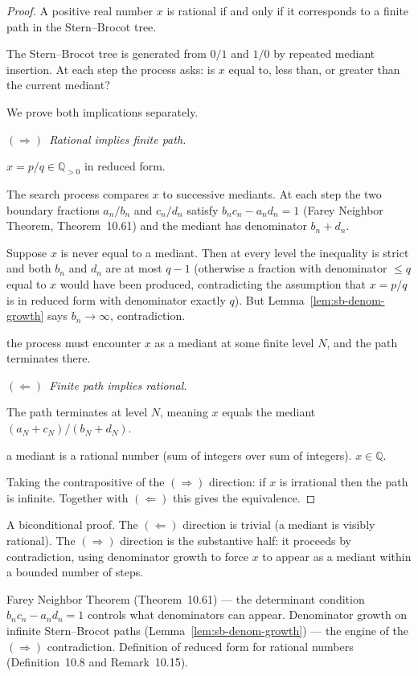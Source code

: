 \begin{proof}
\Claim A positive real number $x$ is rational if and only if it
corresponds to a finite path in the Stern--Brocot tree.

\Given The Stern--Brocot tree is generated from $0/1$ and $1/0$ by
repeated mediant insertion. At each step the process asks: is $x$ equal
to, less than, or greater than the current mediant?

\Strategy We prove both implications separately.

\medskip
\noindent$(\Rightarrow)$\ \textit{Rational implies finite path.}

\Given $x = p/q \in \mathbb{Q}_{>0}$ in reduced form.

The search process compares $x$ to successive mediants.  At each step
the two boundary fractions $a_n/b_n$ and $c_n/d_n$ satisfy $b_n c_n -
a_n d_n = 1$ (Farey Neighbor Theorem, Theorem~10.61) and the mediant
has denominator $b_n + d_n$.

Suppose $x$ is never equal to a mediant. Then at every level the
inequality is strict and both $b_n$ and $d_n$ are at most $q - 1$
(otherwise a fraction with denominator $\le q$ equal to $x$ would have
been produced, contradicting the assumption that $x = p/q$ is in reduced
form with denominator exactly $q$). But Lemma~\ref{lem:sb-denom-growth}
says $b_n \to \infty$, contradiction.

\Therefore the process must encounter $x$ as a mediant at some finite
level $N$, and the path terminates there. \checkbox

\medskip
\noindent$(\Leftarrow)$\ \textit{Finite path implies rational.}

\Given The path terminates at level $N$, meaning $x$ equals the mediant
$(a_N + c_N)/(b_N + d_N)$.

\ByDef a mediant is a rational number (sum of integers over sum of
integers).
\Therefore $x \in \mathbb{Q}$. \checkbox

\medskip
Taking the contrapositive of the $(\Rightarrow)$ direction:
if $x$ is irrational then the path is infinite.
Together with $(\Leftarrow)$ this gives the equivalence. \AsReq
\end{proof}

\begin{remark*}
A biconditional proof. The $(\Leftarrow)$ direction is trivial (a mediant
is visibly rational). The $(\Rightarrow)$ direction is the substantive half:
it proceeds by contradiction, using denominator growth to force $x$ to
appear as a mediant within a bounded number of steps.
\end{remark*}

\begin{remark*}[Dependencies]
Farey Neighbor Theorem (Theorem~10.61) --- the determinant condition
$b_n c_n - a_n d_n = 1$ controls what denominators can appear. Denominator
growth on infinite Stern--Brocot paths (Lemma~\ref{lem:sb-denom-growth})
--- the engine of the $(\Rightarrow)$ contradiction. Definition of reduced
form for rational numbers (Definition~10.8 and Remark~10.15).
\end{remark*}